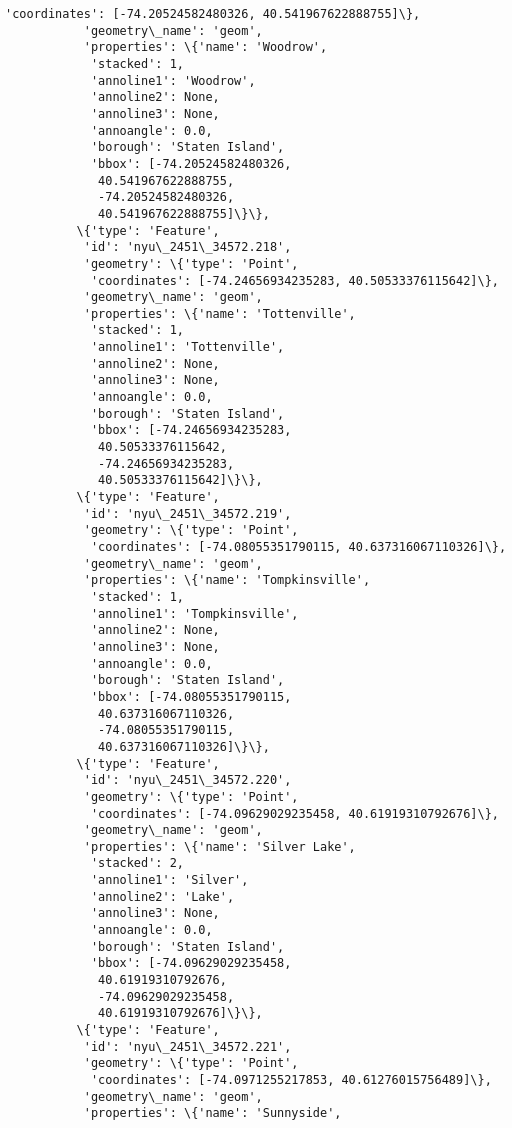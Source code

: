 \documentclass[11pt]{article}
\begin{document}
\begin{Verbatim}[commandchars=\\\{\}]
            'coordinates': [-74.20524582480326, 40.541967622888755]\},
           'geometry\_name': 'geom',
           'properties': \{'name': 'Woodrow',
            'stacked': 1,
            'annoline1': 'Woodrow',
            'annoline2': None,
            'annoline3': None,
            'annoangle': 0.0,
            'borough': 'Staten Island',
            'bbox': [-74.20524582480326,
             40.541967622888755,
             -74.20524582480326,
             40.541967622888755]\}\},
          \{'type': 'Feature',
           'id': 'nyu\_2451\_34572.218',
           'geometry': \{'type': 'Point',
            'coordinates': [-74.24656934235283, 40.50533376115642]\},
           'geometry\_name': 'geom',
           'properties': \{'name': 'Tottenville',
            'stacked': 1,
            'annoline1': 'Tottenville',
            'annoline2': None,
            'annoline3': None,
            'annoangle': 0.0,
            'borough': 'Staten Island',
            'bbox': [-74.24656934235283,
             40.50533376115642,
             -74.24656934235283,
             40.50533376115642]\}\},
          \{'type': 'Feature',
           'id': 'nyu\_2451\_34572.219',
           'geometry': \{'type': 'Point',
            'coordinates': [-74.08055351790115, 40.637316067110326]\},
           'geometry\_name': 'geom',
           'properties': \{'name': 'Tompkinsville',
            'stacked': 1,
            'annoline1': 'Tompkinsville',
            'annoline2': None,
            'annoline3': None,
            'annoangle': 0.0,
            'borough': 'Staten Island',
            'bbox': [-74.08055351790115,
             40.637316067110326,
             -74.08055351790115,
             40.637316067110326]\}\},
          \{'type': 'Feature',
           'id': 'nyu\_2451\_34572.220',
           'geometry': \{'type': 'Point',
            'coordinates': [-74.09629029235458, 40.61919310792676]\},
           'geometry\_name': 'geom',
           'properties': \{'name': 'Silver Lake',
            'stacked': 2,
            'annoline1': 'Silver',
            'annoline2': 'Lake',
            'annoline3': None,
            'annoangle': 0.0,
            'borough': 'Staten Island',
            'bbox': [-74.09629029235458,
             40.61919310792676,
             -74.09629029235458,
             40.61919310792676]\}\},
          \{'type': 'Feature',
           'id': 'nyu\_2451\_34572.221',
           'geometry': \{'type': 'Point',
            'coordinates': [-74.0971255217853, 40.61276015756489]\},
           'geometry\_name': 'geom',
           'properties': \{'name': 'Sunnyside',

\end{Verbatim}
\end{document}
